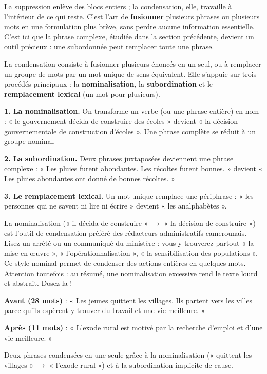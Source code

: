 \documentclass[11pt]{article}
\newcommand{\cle}[1]{{\popxbold\color{popdark}#1}}
\newcounter{popsec}
\newcounter{popsub}
\newcommand{\courssub}[1]{%
  \stepcounter{popsub}%
  \par\vspace{9pt}\noindent{\popxbold\fontsize{11.5}{13}\selectfont\color{popink}{\color{poporange}\thepopsec.\thepopsub}\hspace{6pt}#1}\par\nopagebreak\vspace{4pt}
}
\begin{document}
La suppression enlève des blocs entiers ; la \cle{condensation}, elle, travaille à l'intérieur de ce qui reste. C'est l'art de \textbf{fusionner} plusieurs phrases ou plusieurs mots en une formulation plus brève, sans perdre aucune information essentielle. C'est ici que la phrase complexe, étudiée dans la section précédente, devient un outil précieux : une subordonnée peut remplacer toute une phrase.

\begin{definition}[La condensation]
La \cle{condensation} consiste à fusionner plusieurs énoncés en un seul, ou à remplacer un groupe de mots par un mot unique de sens équivalent. Elle s'appuie sur trois procédés principaux : la \textbf{nominalisation}, la \textbf{subordination} et le \textbf{remplacement lexical} (un mot pour plusieurs).
\end{definition}

\courssub{Les trois procédés de condensation}

\textbf{1. La nominalisation.} On transforme un verbe (ou une phrase entière) en nom : « le gouvernement décida de construire des écoles » devient « la décision gouvernementale de construction d'écoles ». Une phrase complète se réduit à un groupe nominal.

\textbf{2. La subordination.} Deux phrases juxtaposées deviennent une phrase complexe : « Les pluies furent abondantes. Les récoltes furent bonnes. » devient « Les pluies abondantes ont donné de bonnes récoltes. »

\textbf{3. Le remplacement lexical.} Un mot unique remplace une périphrase : « les personnes qui ne savent ni lire ni écrire » devient « les analphabètes ».

\begin{savaistu}
La nominalisation (« il décida de construire » $\rightarrow$ « la décision de construire ») est l'outil de condensation préféré des rédacteurs administratifs camerounais. Lisez un arrêté ou un communiqué du ministère : vous y trouverez partout « la mise en œuvre », « l'opérationnalisation », « la sensibilisation des populations ». Ce style nominal permet de condenser des actions entières en quelques mots. Attention toutefois : au résumé, une nominalisation excessive rend le texte lourd et abstrait. Dosez-la !
\end{savaistu}

\begin{exemplebox}
\textbf{Avant (28 mots)} : « Les jeunes quittent les villages. Ils partent vers les villes parce qu'ils espèrent y trouver du travail et une vie meilleure. »

\textbf{Après (11 mots)} : « L'exode rural est motivé par la recherche d'emploi et d'une vie meilleure. »

Deux phrases condensées en une seule grâce à la nominalisation (« quittent les villages » $\rightarrow$ « l'exode rural ») et à la subordination implicite de cause.
\end{exemplebox}
\end{document}

